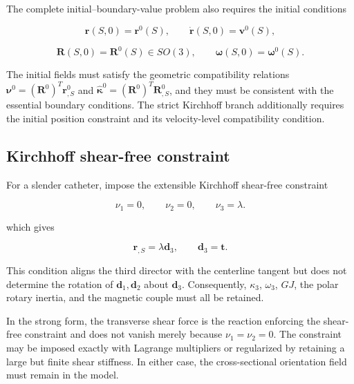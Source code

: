 The complete initial--boundary-value problem also requires the initial conditions

\begin{equation}
\label{eq:rod-1-95}
\mathbf{r}(S,0) = \mathbf{r}^{0}(S),\quad\quad\dot{\mathbf{r}}(S,0) = \mathbf{v}^{0}(S),
\end{equation}

\begin{equation}
\label{eq:rod-1-96}
\mathbf{R}(S,0) = \mathbf{R}^{0}(S) \in SO(3),\quad\quad\bm{\omega}(S,0) = \bm{\omega}^{0}(S).
\end{equation}

The initial fields must satisfy the geometric compatibility relations \(\bm{\nu}^{0} = \left( \mathbf{R}^{0} \right)^{T}\mathbf{r}_{,S}^{0}\) and \({\widehat{\bm{\kappa}}}^{0} = \left( \mathbf{R}^{0} \right)^{T}\mathbf{R}_{,S}^{0}\), and they must be consistent with the essential boundary conditions. The strict Kirchhoff branch additionally requires the initial position constraint and its velocity-level compatibility condition.

\subsection{Kirchhoff shear-free constraint}\label{sec:rod-1-6}

For a slender catheter, impose the extensible Kirchhoff shear-free constraint

\begin{equation}
\label{eq:rod-1-97}
\nu_{1} = 0,\quad\quad\nu_{2} = 0,\quad\quad\nu_{3} = \lambda.
\end{equation}

which gives

\begin{equation}
\label{eq:rod-1-98}
\mathbf{r}_{,S} = \lambda\mathbf{d}_{3},\quad\quad\mathbf{d}_{3} = \mathbf{t}.
\end{equation}

This condition aligns the third director with the centerline tangent but does not determine the rotation of \(\mathbf{d}_{1},\mathbf{d}_{2}\) about \(\mathbf{d}_{3}\). Consequently, \(\kappa_{3}\), \(\omega_{3}\), \(GJ\), the polar rotary inertia, and the magnetic couple must all be retained.

In the strong form, the transverse shear force is the reaction enforcing the shear-free constraint and does not vanish merely because \(\nu_{1} = \nu_{2} = 0\). The constraint may be imposed exactly with Lagrange multipliers or regularized by retaining a large but finite shear stiffness. In either case, the cross-sectional orientation field must remain in the model.\cite{MarsdenRatiu1999MechanicsSymmetry,HairerLubichWanner2006GNI}

